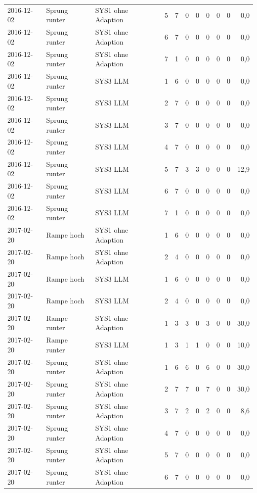 \begin{tabular}{lllrrrrrrrr}
2016-12-02 & Sprung runter & SYS1 ohne Adaption & 5 & 7 & 0 & 0 & 0 & 0 & 0 & 0,0 \\
2016-12-02 & Sprung runter & SYS1 ohne Adaption & 6 & 7 & 0 & 0 & 0 & 0 & 0 & 0,0 \\
2016-12-02 & Sprung runter & SYS1 ohne Adaption & 7 & 1 & 0 & 0 & 0 & 0 & 0 & 0,0 \\
2016-12-02 & Sprung runter & SYS3 LLM & 1 & 6 & 0 & 0 & 0 & 0 & 0 & 0,0 \\
2016-12-02 & Sprung runter & SYS3 LLM & 2 & 7 & 0 & 0 & 0 & 0 & 0 & 0,0 \\
2016-12-02 & Sprung runter & SYS3 LLM & 3 & 7 & 0 & 0 & 0 & 0 & 0 & 0,0 \\
2016-12-02 & Sprung runter & SYS3 LLM & 4 & 7 & 0 & 0 & 0 & 0 & 0 & 0,0 \\
2016-12-02 & Sprung runter & SYS3 LLM & 5 & 7 & 3 & 3 & 0 & 0 & 0 & 12,9 \\
2016-12-02 & Sprung runter & SYS3 LLM & 6 & 7 & 0 & 0 & 0 & 0 & 0 & 0,0 \\
2016-12-02 & Sprung runter & SYS3 LLM & 7 & 1 & 0 & 0 & 0 & 0 & 0 & 0,0 \\
2017-02-20 & Rampe hoch & SYS1 ohne Adaption & 1 & 6 & 0 & 0 & 0 & 0 & 0 & 0,0 \\
2017-02-20 & Rampe hoch & SYS1 ohne Adaption & 2 & 4 & 0 & 0 & 0 & 0 & 0 & 0,0 \\
2017-02-20 & Rampe hoch & SYS3 LLM & 1 & 6 & 0 & 0 & 0 & 0 & 0 & 0,0 \\
2017-02-20 & Rampe hoch & SYS3 LLM & 2 & 4 & 0 & 0 & 0 & 0 & 0 & 0,0 \\
2017-02-20 & Rampe runter & SYS1 ohne Adaption & 1 & 3 & 3 & 0 & 3 & 0 & 0 & 30,0 \\
2017-02-20 & Rampe runter & SYS3 LLM & 1 & 3 & 1 & 1 & 0 & 0 & 0 & 10,0 \\
2017-02-20 & Sprung runter & SYS1 ohne Adaption & 1 & 6 & 6 & 0 & 6 & 0 & 0 & 30,0 \\
2017-02-20 & Sprung runter & SYS1 ohne Adaption & 2 & 7 & 7 & 0 & 7 & 0 & 0 & 30,0 \\
2017-02-20 & Sprung runter & SYS1 ohne Adaption & 3 & 7 & 2 & 0 & 2 & 0 & 0 & 8,6 \\
2017-02-20 & Sprung runter & SYS1 ohne Adaption & 4 & 7 & 0 & 0 & 0 & 0 & 0 & 0,0 \\
2017-02-20 & Sprung runter & SYS1 ohne Adaption & 5 & 7 & 0 & 0 & 0 & 0 & 0 & 0,0 \\
2017-02-20 & Sprung runter & SYS1 ohne Adaption & 6 & 7 & 0 & 0 & 0 & 0 & 0 & 0,0 \\

\end{tabular}
